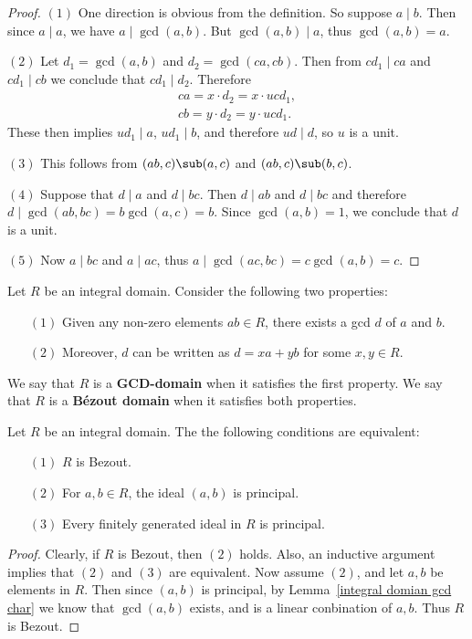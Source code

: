 \begin{proof}
$(1)$ One direction is obvious from the definition. So suppose $a\mid b$. Then since $a\mid a$, we have $a\mid\gcd(a,b)$. But $\gcd(a,b)\mid a$, thus $\gcd(a,b)=a$.\par
$(2)$ Let $d_1=\gcd(a,b)$ and $d_2=\gcd(ca,cb)$. Then from $cd_1\mid ca$ and $cd_1\mid cb$ we conclude that $cd_1\mid d_2$. Therefore
\begin{align*}
ca=x\cdot d_2=x\cdot ucd_1,\\
cb=y\cdot d_2=y\cdot ucd_1.
\end{align*}
These then implies $ud_1\mid a$, $ud_1\mid b$, and therefore $ud\mid d$, so $u$ is a unit.\par
$(3)$ This follows from $(ab,c)\sub(a,c)$ and $(ab,c)\sub(b,c)$.\par
$(4)$ Suppose that $d\mid a$ and $d\mid bc$. Then $d\mid ab$ and $d\mid bc$ and therefore $d\mid\gcd(ab,bc)=b\gcd(a,c)=b$. Since $\gcd(a,b)=1$, we conclude that $d$ is a unit.\par
$(5)$ Now $a\mid bc$ and $a\mid ac$, thus $a\mid\gcd(ac,bc)=c\gcd(a,b)=c$.
\end{proof}
\begin{definition}
Let $R$ be an integral domain. Consider the following two properties:
\begin{itemize}
\item[$(1)$] Given any non-zero elements $ab\in R$, there exists a gcd $d$ of $a$ and $b$.
\item[$(2)$] Moreover, $d$ can be written as $d=xa+yb$ for some $x,y\in R$.
\end{itemize}
We say that $R$ is a \textbf{GCD-domain} when it satisfies the first property. We say that $R$ is a \textbf{B\'ezout domain} when it satisfies both properties.
\end{definition}
\begin{proposition}
Let $R$ be an integral domain. The the following conditions are equivalent:
\begin{itemize}
\item[$(1)$] $R$ is Bezout.
\item[$(2)$] For $a,b\in R$, the ideal $(a,b)$ is principal.
\item[$(3)$] Every finitely generated ideal in $R$ is principal.
\end{itemize}
\end{proposition}
\begin{proof}
Clearly, if $R$ is Bezout, then $(2)$ holds. Also, an inductive argument implies that $(2)$ and $(3)$ are equivalent. Now assume $(2)$, and let $a,b$ be elements in $R$. Then since $(a,b)$ is principal, by Lemma~\ref{integral domian gcd char} we know that $\gcd(a,b)$ exists, and is a linear conbination of $a,b$. Thus $R$ is Bezout.
\end{proof}
